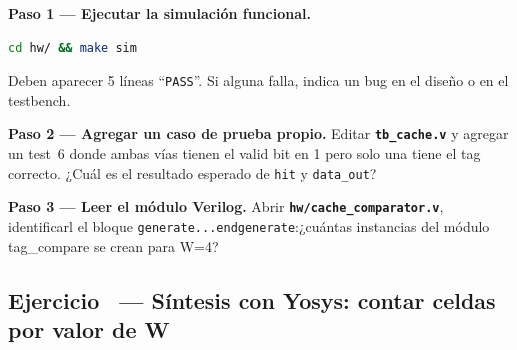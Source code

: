 \documentclass[12pt, a4paper]{article}
\newcommand{\archivo}[1]{\texttt{\textbf{#1}}}
\newcounter{ejnum}
\newcommand{\ejerciciosec}[1]{%
  \stepcounter{ejnum}%
  \subsection{Ejercicio \theejnum\ — #1}%
}
\begin{document}
\begin{ejercicio}
    \textbf{Paso 1 — Ejecutar la simulación funcional.}
\begin{lstlisting}[language=bash, numbers=none]
cd hw/ && make sim
\end{lstlisting}
    Deben aparecer 5 líneas ``\texttt{PASS}''. Si alguna falla, indica un bug
    en el diseño o en el testbench.

    \textbf{Paso 2 — Agregar un caso de prueba propio.} \newline
    Editar \archivo{tb\_cache.v} y agregar un test~6 donde ambas vías
    tienen el valid bit en 1 pero solo una tiene el tag correcto.
    ¿Cuál es el resultado esperado de \texttt{hit} y \texttt{data\_out}?

    \textbf{Paso 3 — Leer el módulo Verilog.}
    Abrir \archivo{hw/cache\_comparator.v}, identificarl el bloque \texttt{generate...endgenerate}:\newpage ¿cuántas instancias
              del módulo tag\_compare se crean para W=4?



\end{ejercicio}
\newpage
\ejerciciosec{Síntesis con Yosys: contar celdas por valor de W}
\end{document}
